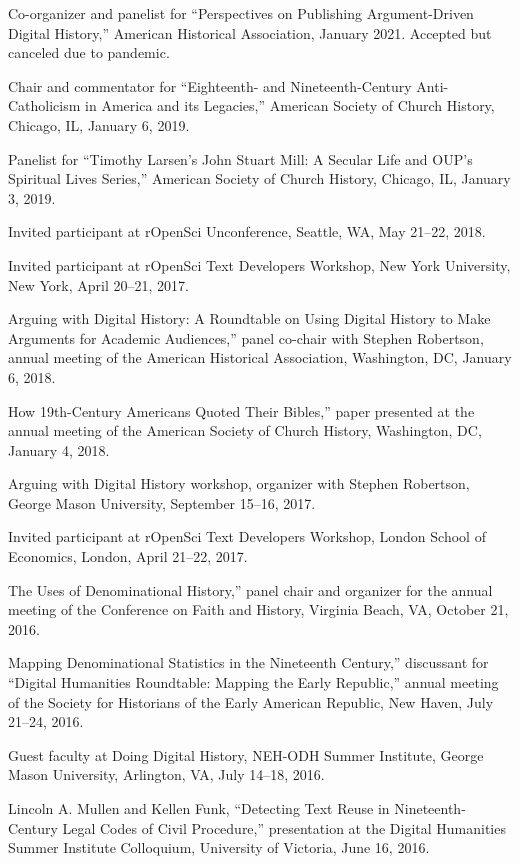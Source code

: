 \documentclass[11pt]{article}
\begin{document}
Co-organizer and panelist for ``Perspectives on Publishing Argument-Driven Digital History,'' American Historical Association, January 2021. Accepted but canceled due to pandemic.

Chair and commentator for ``Eighteenth- and Nineteenth-Century Anti-Catholicism in America and its Legacies,'' American Society of Church History, Chicago, IL, January 6, 2019.

Panelist for ``Timothy Larsen's John Stuart Mill: A Secular Life and OUP's Spiritual Lives Series,'' American Society of Church History, Chicago, IL, January 3, 2019.

Invited participant at rOpenSci Unconference, Seattle, WA, May 21--22, 2018.

Invited participant at rOpenSci Text Developers Workshop, New York University, New York, April 20--21, 2017.

\noindent{}Arguing with Digital History: A Roundtable on Using Digital History to Make Arguments for Academic Audiences,'' panel co-chair with Stephen Robertson, annual meeting of the American Historical Association, Washington, DC, January 6, 2018.

\noindent{}How 19th-Century Americans Quoted Their Bibles,'' paper presented at the annual meeting of the American Society of Church History, Washington, DC, January 4, 2018.

Arguing with Digital History workshop, organizer with Stephen Robertson, George Mason University, September 15--16, 2017.

Invited participant at rOpenSci Text Developers Workshop, London School of Economics, London, April 21--22, 2017.

\noindent{}The Uses of Denominational History,'' panel chair and organizer for the annual meeting of the Conference on Faith and History, Virginia Beach, VA, October 21, 2016.

\noindent{}Mapping Denominational Statistics in the Nineteenth Century,'' discussant for ``Digital Humanities Roundtable: Mapping the Early Republic,'' annual meeting of the Society for Historians of the Early American Republic, New Haven, July 21--24, 2016.

Guest faculty at Doing Digital History, NEH-ODH Summer Institute, George Mason University, Arlington, VA, July 14--18, 2016.

Lincoln A. Mullen and Kellen Funk, ``Detecting Text Reuse in Nineteenth-Century Legal Codes of Civil Procedure,'' presentation at the Digital Humanities Summer Institute Colloquium, University of Victoria, June 16, 2016.
\end{document}
